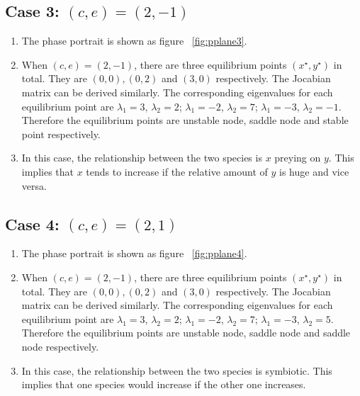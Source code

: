 \subsection*{Case 3: $(c,e)=(2,-1)$}
\begin{enumerate}
\item The phase portrait is shown as figure ~\ref{fig:pplane3}.
\item When $(c,e)=(2,-1)$, there are three equilibrium points $(x^\star,y^\star)$ in total. They are $(0,0),(0,2)$ and $(3,0)$ respectively. The Jocabian matrix can be derived similarly. The corresponding eigenvalues for each equilibrium point are $\lambda_{1} = 3$, $\lambda_{2} = 2$; $\lambda_1 = -2$, $\lambda_2 = 7$; $\lambda_1 = -3$, $\lambda_2 = -1$. Therefore the equilibrium points are unstable node, saddle node and stable point respectively. 
\item In this case, the relationship between the two species is $x$ preying on $y$. This implies that $x$ tends to increase if the relative amount of $y$ is huge and vice versa.   
\end{enumerate}

\subsection*{Case 4: $(c,e)=(2,1)$}
\begin{enumerate}
\item The phase portrait is shown as figure ~\ref{fig:pplane4}. 
\item When $(c,e)=(2,-1)$, there are three equilibrium points $(x^\star,y^\star)$ in total. They are $(0,0),(0,2)$ and $(3,0)$ respectively. The Jocabian matrix can be derived similarly. The corresponding eigenvalues for each equilibrium point are $\lambda_{1} = 3$, $\lambda_{2} = 2$; $\lambda_1 = -2$, $\lambda_2 = 7$; $\lambda_1 = -3$, $\lambda_2 = 5$. Therefore the equilibrium points are unstable node, saddle node and saddle node respectively. 
\item In this case, the relationship between the two species is symbiotic. This implies that one species would increase if the other one increases. 
\end{enumerate}